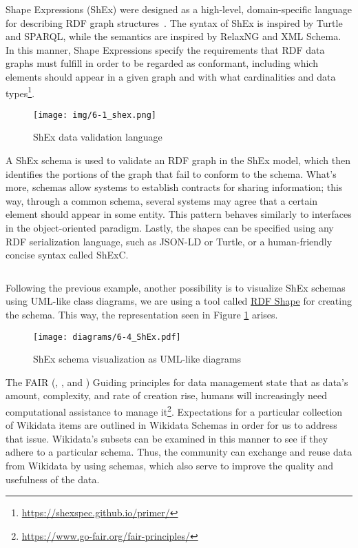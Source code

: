 Shape Expressions (ShEx) were designed as a high-level, domain-specific language for describing RDF graph structures~\cite{https://doi.org/10.48550/arxiv.2110.11709}. The syntax of ShEx is inspired by Turtle and SPARQL, while the semantics are inspired by RelaxNG and XML Schema. In this manner, Shape Expressions specify the requirements that RDF data graphs must fulfill in order to be regarded as conformant, including which elements should appear in a given graph and with what cardinalities and data types\footnote{\url{https://shexspec.github.io/primer/}}.

\begin{figure}[ht]
    \centering
    \texttt{[image: img/6-1\_shex.png]}
    \caption{ShEx data validation language}
\end{figure}

A ShEx schema is used to validate an RDF graph in the ShEx model, which then identifies the portions of the graph that fail to conform to the schema. What's more, schemas allow systems to establish contracts for sharing information; this way, through a common schema, several systems may agree that a certain element should appear in some entity. This pattern behaves similarly to interfaces in the object-oriented paradigm. Lastly, the shapes can be specified using any RDF serialization language, such as JSON-LD or Turtle, or a human-friendly concise syntax called ShExC.

\begin{code}
    \inputminted{shex}{code/listings/6-4_shex.shex}
\end{code}

Following the previous example, another possibility is to visualize ShEx schemas using UML-like class diagrams, we are using a tool called \href{https://rdfshape.weso.es/shexInfo}{RDF Shape} for creating the schema. This way, the representation seen in Figure \ref{fig:RDFshape} arises.

\begin{figure}[ht]
    \centering
    \texttt{[image: diagrams/6-4\_ShEx.pdf]}
    \caption{ShEx schema visualization as UML-like diagrams}
    \label{fig:RDFshape}
\end{figure}

The FAIR (, ,  and ) Guiding principles for data management state that as data's amount, complexity, and rate of creation rise, humans will increasingly need computational assistance to manage it\footnote{\url{https://www.go-fair.org/fair-principles/}}. Expectations for a particular collection of Wikidata items are outlined in Wikidata Schemas in order for us to address that issue. Wikidata's subsets can be examined in this manner to see if they adhere to a particular schema. Thus, the community can exchange and reuse data from Wikidata by using schemas, which also serve to improve the quality and usefulness of the data.

